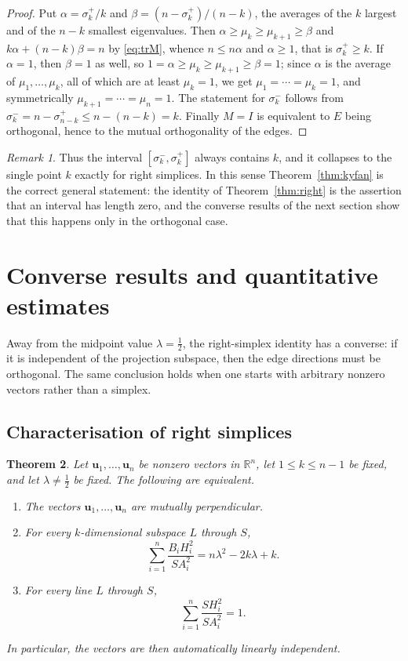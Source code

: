 \documentclass[11pt]{article}
\newtheorem{theorem}{Theorem}[section]
\theoremstyle{definition}
\theoremstyle{remark}
\newtheorem{remark}[theorem]{Remark}
\newcommand{\R}{\mathbb{R}}
\newcommand{\bu}{\mathbf u}
\begin{document}
\begin{proof}
Put $\alpha=\sigma_k^{+}/k$ and $\beta=(n-\sigma_k^{+})/(n-k)$, the averages of the $k$
largest and of the $n-k$ smallest eigenvalues. Then
$\alpha\ge\mu_k\ge\mu_{k+1}\ge\beta$ and $k\alpha+(n-k)\beta=n$ by \eqref{eq:trM}, whence
$n\le n\alpha$ and $\alpha\ge1$, that is $\sigma_k^{+}\ge k$. If $\alpha=1$, then
$\beta=1$ as well, so $1=\alpha\ge\mu_k\ge\mu_{k+1}\ge\beta=1$; since $\alpha$ is the average
of $\mu_1,\ldots,\mu_k$, all of which are at least $\mu_k=1$, we get
$\mu_1=\cdots=\mu_k=1$, and symmetrically $\mu_{k+1}=\cdots=\mu_n=1$. The statement for
$\sigma_k^{-}$ follows from $\sigma_k^{-}=n-\sigma_{n-k}^{+}\le n-(n-k)=k$. Finally
$M=I$ is equivalent to $E$ being orthogonal, hence to the mutual orthogonality of the edges.
\end{proof}

\begin{remark}
Thus the interval $[\sigma_k^{-},\sigma_k^{+}]$ always contains $k$, and it collapses to the
single point $k$ exactly for right simplices. In this sense Theorem~\ref{thm:kyfan} is the
correct general statement: the identity of Theorem~\ref{thm:right} is the assertion that an
interval has length zero, and the converse results of the next section show that this happens only in the orthogonal case.
\end{remark}

\section{Converse results and quantitative estimates}\label{sec:converse}

Away from the midpoint value $\lambda=\tfrac12$, the right-simplex identity has a converse:
if it is independent of the projection subspace, then the edge directions must be orthogonal.
The same conclusion holds when one starts with arbitrary nonzero vectors rather than a
simplex.

\subsection{Characterisation of right simplices}

\begin{theorem}\label{thm:converse}
Let $\bu_1,\ldots,\bu_n$ be nonzero vectors in $\R^n$, let $1\le k\le n-1$ be fixed, and
let $\lambda\ne\tfrac12$ be fixed. The following are equivalent.
\begin{enumerate}
\item[\rm(i)] The vectors $\bu_1,\ldots,\bu_n$ are mutually perpendicular.
\item[\rm(ii)] For every $k$-dimensional subspace $L$ through $S$,
\[
\sum_{i=1}^{n}\frac{B_iH_i^2}{SA_i^2}=n\lambda^2-2k\lambda+k.
\]
\item[\rm(iii)] For every line $L$ through $S$,
\[
\sum_{i=1}^{n}\frac{SH_i^2}{SA_i^2}=1.
\]
\end{enumerate}
In particular, the vectors are then automatically linearly independent.
\end{theorem}
\end{document}
